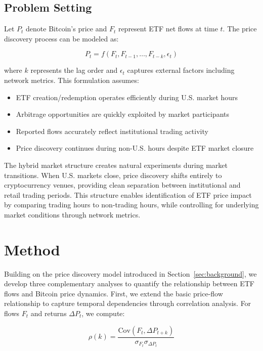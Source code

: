 \documentclass{article} %
\begin{document}
\subsection{Problem Setting}

Let $P_t$ denote Bitcoin's price and $F_t$ represent ETF net flows at time $t$. The price discovery process can be modeled as:

\begin{equation}
    P_t = f(F_t, F_{t-1}, \ldots, F_{t-k}, \epsilon_t)
\end{equation}

where $k$ represents the lag order and $\epsilon_t$ captures external factors including network metrics. This formulation assumes:

\begin{itemize}
    \item ETF creation/redemption operates efficiently during U.S. market hours
    \item Arbitrage opportunities are quickly exploited by market participants
    \item Reported flows accurately reflect institutional trading activity
    \item Price discovery continues during non-U.S. hours despite ETF market closure
\end{itemize}

The hybrid market structure creates natural experiments during market transitions. When U.S. markets close, price discovery shifts entirely to cryptocurrency venues, providing clean separation between institutional and retail trading periods. This structure enables identification of ETF price impact by comparing trading hours to non-trading hours, while controlling for underlying market conditions through network metrics.

\section{Method}
\label{sec:method}

Building on the price discovery model introduced in Section~\ref{sec:background}, we develop three complementary analyses to quantify the relationship between ETF flows and Bitcoin price dynamics. First, we extend the basic price-flow relationship to capture temporal dependencies through correlation analysis. For flows $F_t$ and returns $\Delta P_t$, we compute:

\begin{equation}
    \rho(k) = \frac{\text{Cov}(F_t, \Delta P_{t+k})}{\sigma_{F_t}\sigma_{\Delta P_t}}
\end{equation}
\end{document}
